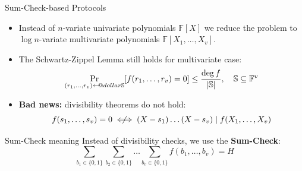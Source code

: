 \documentclass{zkdl-presentation-template}
\makeatletter
\newcommand\leftarrowS{\leftarrow\joinrel\smalldollar}
\newcommand{\smalldollar}{\mathrel{\mathpalette\small@dollar\relax}}
\newcommand{\small@dollar}[2]{%
  \vcenter{\hbox{%
    $#1\textnormal{\fontsize{0.7\dimexpr\f@size pt}{0}\selectfont\$}$%
  }}%
}
\makeatother
\begin{document}
    \begin{frame}{Sum-Check-based Protocols}
        \begin{itemize}
            \item Instead of $n$-variate univariate polynomials $\mathbb{F}[X]$
            we reduce the problem to $\log n$-variate multivariate polynomials
            $\mathbb{F}[X_1,\dots,X_v]$.
            \item The Schwartz-Zippel Lemma still holds for multivariate case:
            \begin{equation*}
                \mathop{\text{Pr}}_{(r_1,\dots,r_v) \leftarrowS \mathbb{S}}[f(r_1,\dots,r_v) = 0] \leq \frac{\deg f}{|\mathbb{S}|}, \quad \mathbb{S} \subseteq \mathbb{F}^v
            \end{equation*}
            \item \textbf{Bad news:} divisibility theorems do not hold:
            \begin{equation*}
                f(s_1,\dots,s_v) = 0 \centernot\iff (X-s_1)\dots (X-s_v) \mid f(X_1,\dots,X_v)
            \end{equation*}
        \end{itemize}

        \begin{alertblock}{Sum-Check meaning}
            Instead of divisibility checks, we use the \textbf{Sum-Check}:
            \begin{equation*}
                \sum_{b_1 \in \{0,1\}}\sum_{b_2 \in \{0,1\}}\dots \sum_{b_v \in \{0,1\}} f(b_1,\dots,b_v) = H
            \end{equation*}
        \end{alertblock}
    \end{frame}
\end{document}

